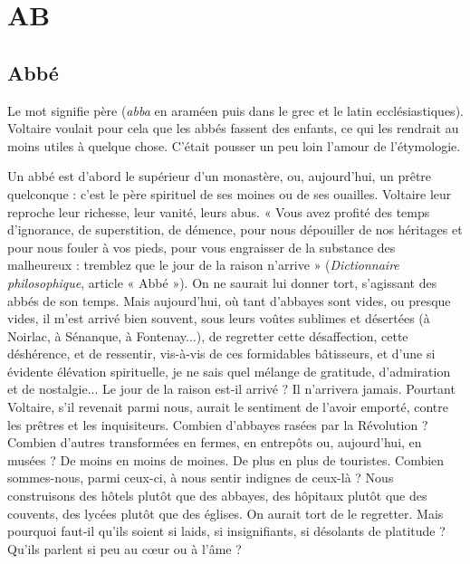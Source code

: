 \chapter{AB}

\section{Abbé}
Le mot signifie père ({\it abba} en araméen puis dans le grec et le latin
ecclésiastiques). Voltaire voulait pour cela que les abbés fassent des
enfants, ce qui les rendrait au moins utiles à quelque chose. C'était pousser
un peu loin l’amour de l’étymologie.

Un abbé est d’abord le supérieur d’un monastère, ou, aujourd’hui, un
prêtre quelconque : c’est le père spirituel de ses moines ou de ses ouailles. Voltaire
leur reproche leur richesse, leur vanité, leurs abus. « Vous avez profité des
temps d’ignorance, de superstition, de démence, pour nous dépouiller de nos
héritages et pour nous fouler à vos pieds, pour vous engraisser de la substance
des malheureux : tremblez que le jour de la raison n’arrive » ({\it Dictionnaire philosophique},
article « Abbé »). On ne saurait lui donner tort, s’agissant des abbés
de son temps. Mais aujourd’hui, où tant d’abbayes sont vides, ou presque vides,
il m'est arrivé bien souvent, sous leurs voûtes sublimes et désertées (à Noirlac,
à Sénanque, à Fontenay...), de regretter cette désaffection, cette déshérence, et
de ressentir, vis-à-vis de ces formidables bâtisseurs, et d’une si évidente élévation
spirituelle, je ne sais quel mélange de gratitude, d’admiration et de nostalgie...
Le jour de la raison est-il arrivé ? Il n’arrivera jamais. Pourtant Voltaire,
s’il revenait parmi nous, aurait le sentiment de l'avoir emporté, contre les
prêtres et les inquisiteurs. Combien d’abbayes rasées par la Révolution ? Combien
d’autres transformées en fermes, en entrepôts ou, aujourd’hui, en musées ?
De moins en moins de moines. De plus en plus de touristes. Combien
sommes-nous, parmi ceux-ci, à nous sentir indignes de ceux-là ? Nous construisons
des hôtels plutôt que des abbayes, des hôpitaux plutôt que des couvents,
des lycées plutôt que des églises. On aurait tort de le regretter. Mais
pourquoi faut-il qu’ils soient si laids, si insignifiants, si désolants de platitude ?
Qu'ils parlent si peu au cœur ou à l’âme ?

